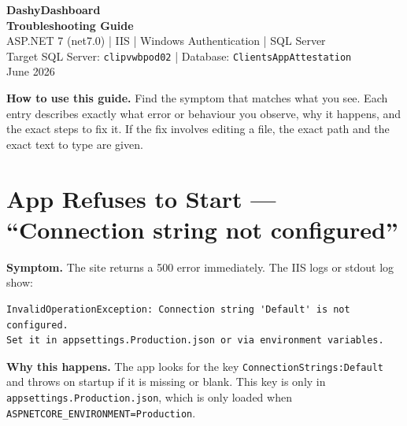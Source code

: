 \documentclass[a4paper,11pt]{article}
\begin{document}

\thispagestyle{empty}

\begin{center}
  {\LARGE\bfseries\color{headblue} DashyDashboard}\\[5pt]
  {\large\bfseries Troubleshooting Guide}\\[5pt]
  {\small ASP.NET 7 (net7.0) \quad|\quad
         IIS \quad|\quad
         Windows Authentication \quad|\quad
         SQL Server}\\[3pt]
  {\small Target SQL Server: \texttt{clipvwbpod02} \quad|\quad
         Database: \texttt{ClientsAppAttestation}}\\[3pt]
  {\small\color{gray} June 2026}
\end{center}

\vspace{4pt}
\noindent{\color{headblue}\rule{\linewidth}{1.2pt}}
\vspace{6pt}

\begin{infobox}
\textbf{How to use this guide.}
Find the symptom that matches what you see.
Each entry describes exactly what error or behaviour you observe,
why it happens, and the exact steps to fix it.
If the fix involves editing a file, the exact path and the exact text to type are given.
\end{infobox}

\tableofcontents
\newpage

\section{App Refuses to Start --- ``Connection string not configured''}
\label{sec:noconnstring}

\textbf{Symptom.}
The site returns a 500 error immediately.
The IIS logs or stdout log show:

\begin{lstlisting}
InvalidOperationException: Connection string 'Default' is not configured.
Set it in appsettings.Production.json or via environment variables.
\end{lstlisting}

\textbf{Why this happens.}
The app looks for the key \texttt{ConnectionStrings:Default} and throws on startup
if it is missing or blank.
This key is only in \texttt{appsettings.Production.json},
which is only loaded when \texttt{ASPNETCORE\_ENVIRONMENT=Production}.
\end{document}
